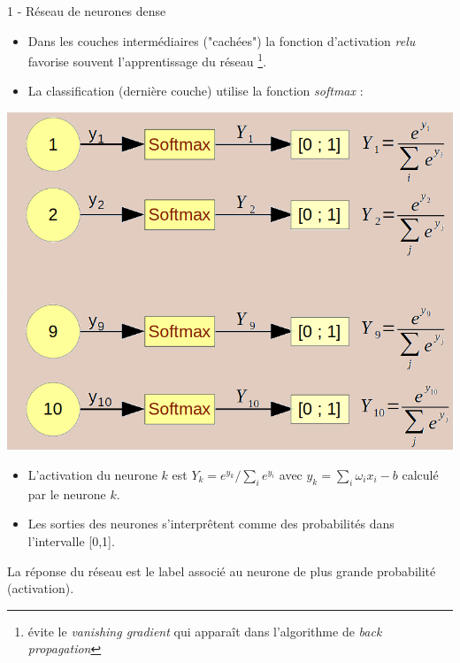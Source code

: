 \documentclass[10pt,serif,mathserif,compress,hyperref={colorlinks}]{beamer}
\begin{document}
\begin{frame}{1 - Réseau de neurones dense}
  \vspace*{-2mm}

  \begin{itemize}
    
  \item Dans les couches intermédiaires ("cachées") la fonction d'activation {\em relu} favorise souvent l'apprentissage du réseau
    \footnote{{\tiny évite le {\em vanishing gradient} qui apparaît dans
        l'algorithme de {\em back propagation}}}.

  \item La classification (dernière couche) utilise la fonction {\em softmax} :

  \end{itemize}

    
  \begin{tcolorbox}[title=Fonction d'activation {\em softmax}]  

    \begin{minipage}{.45\textwidth}
      \hspace*{-5mm}\includegraphics[width=1.\textwidth]{images/softmax-2.png}
    \end{minipage}
    \begin{minipage}{.6\textwidth}
      {\small
        \begin{itemize}
        \item L'activation du neurone $k$ est $Y_k = e^{y_k}/\sum_i{e^{y_i}}$ 
          avec $y_k = \sum_i \omega_i x_i - b$ calculé par le neurone $k$.
        \item Les sorties des neurones s'interprêtent comme des probabilités dans l'intervalle [0,1].
        \end{itemize}
      }
    \end{minipage}
  \end{tcolorbox}

  \vspace*{-1mm}
  La réponse du réseau est le label associé au neurone de plus grande probabilité (activation).

\end{frame}
\end{document}
